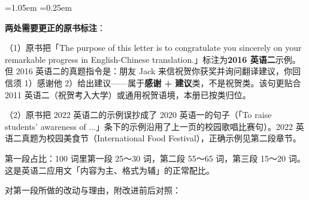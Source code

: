 \documentclass[11pt,a4paper]{ctexart}
\newcommand{\impr}[1]{\par\addvspace{3pt}\noindent{\bfseries【本次改进】}#1\par\addvspace{3pt}}
\newcommand{\tip}[1]{\par\addvspace{3pt}\noindent{\bfseries【提示】}#1\par\addvspace{3pt}}
\newenvironment{note}{%
  \par\addvspace{5pt}%
  \begin{list}{}{\leftmargin=1.05em \rightmargin=0.25em \listparindent=0pt
    \itemindent=0pt \topsep=0pt \parsep=2pt \itemsep=2pt \partopsep=0pt}%
  \item\relax\small\color{ink}%
}{%
  \end{list}\addvspace{5pt}%
}
\begin{document}
\begin{note}
\textbf{两处需要更正的原书标注}：

（1）原书把「The purpose of this letter is to congratulate you sincerely on your remarkable progress in English-Chinese translation.」标注为\textbf{2016 英语二}示例。但 2016 英语二的真题指令是：朋友 Jack 来信祝贺你获奖并询问翻译建议，你回信须 1）感谢他 2）给出建议——属于\textbf{感谢 + 建议}类，不是祝贺类。该句更贴合 2011 英语二（祝贺考入大学）或通用祝贺语境，本册已按类归位。

（2）原书把 2022 英语二的示例误抄成了 2020 英语一的句子（「To raise students' awareness of ...」条下的示例沿用了上一页的校园歌唱比赛句）。2022 英语二真题为校园美食节（International Food Festival），正确示例见第二段章节。

\tip{第一段占比：100 词里第一段 25～30 词，第二段 55～65 词，第三段 15～20 词。这是英语二应用文「内容为主、格式为辅」的正常配比。}
\end{note}

\impr{对第一段所做的改动与理由，附改进前后对照：}
\end{document}
